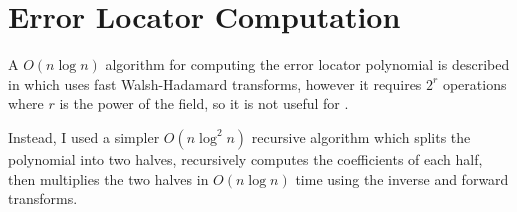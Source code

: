 \section{Error Locator Computation}

A $O(n \log n)$ algorithm for computing the error locator polynomial is described in \cite{novel-poly} which uses fast Walsh-Hadamard transforms, however it requires $2^r$ operations where $r$ is the power of the field, so it is not useful for .

Instead, I used a simpler $O(n \log^2 n)$ recursive algorithm which splits the polynomial into two halves, recursively computes the coefficients of each half, then multiplies the two halves in $O(n \log n)$ time using the inverse and forward transforms.


